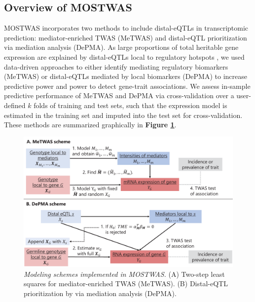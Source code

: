 \subsection{Overview of MOSTWAS}

MOSTWAS incorporates two
methods to include distal-eQTLs
in transcriptomic prediction: mediator-enriched
TWAS (MeTWAS) and distal-eQTL prioritization
via mediation analysis (DePMA). 
As large proportions of total
heritable gene expression are explained
by distal-eQTLs local to regulatory
hotspots 
\cite{Liu2019,Pierce2014,Pierce2018Co-occurringMechanisms,Shan2019},
we used data-driven approaches
to either identify mediating
regulatory biomarkers (MeTWAS)
or distal-eQTLs mediated by 
local biomarkers (DePMA) to
increase predictive power and
power to detect gene-trait associations.
We assess in-sample predictive performance of MeTWAS and DePMA
via cross-validation over a user-defined $k$ folds
of training and test sets,
such that the expression model is estimated
in the training set and imputed into the test set
for cross-validation.
These
methods are summarized graphically
in \textbf{Figure \ref{fig:ch4_fig1}}.


\begin{figure}[!h]
	\includegraphics[width = \textwidth]{figures/ch4_fig1.pdf}
	\caption{\emph{Modeling schemes
	implemented in MOSTWAS.} (A) 
	Two-step least squares for mediator-enriched
	TWAS (MeTWAS). (B)
	Distal-eQTL prioritization by
	via mediation analysis (DePMA).}
	\label{fig:ch4_fig1}
\end{figure}

